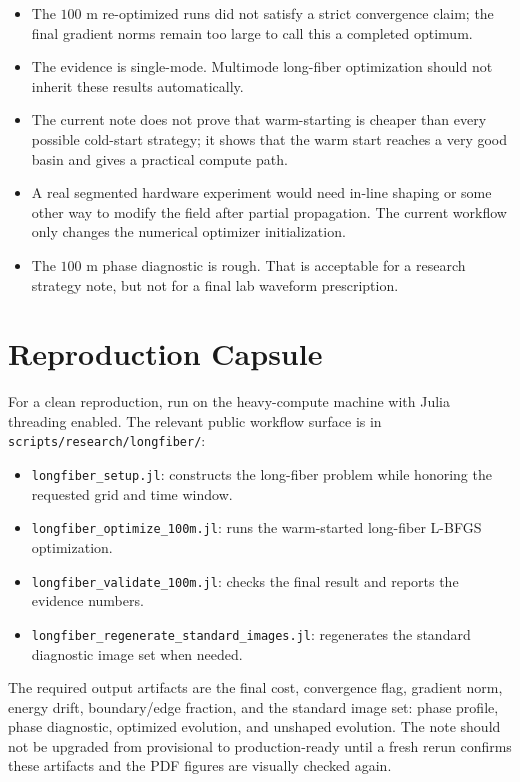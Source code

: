 \documentclass[11pt]{article}
\begin{document}
\begin{itemize}
\item The $100$ m re-optimized runs did not satisfy a strict convergence claim;
the final gradient norms remain too large to call this a completed optimum.
\item The evidence is single-mode.  Multimode long-fiber optimization should
not inherit these results automatically.
\item The current note does not prove that warm-starting is cheaper than every
possible cold-start strategy; it shows that the warm start reaches a very good
basin and gives a practical compute path.
\item A real segmented hardware experiment would need in-line shaping or some
other way to modify the field after partial propagation.  The current workflow
only changes the numerical optimizer initialization.
\item The $100$ m phase diagnostic is rough.  That is acceptable for a research
strategy note, but not for a final lab waveform prescription.
\end{itemize}

\section{Reproduction Capsule}

For a clean reproduction, run on the heavy-compute machine with Julia threading
enabled.  The relevant public workflow surface is in
\texttt{scripts/research/longfiber/}:
\begin{itemize}
\item \texttt{longfiber\_setup.jl}: constructs the long-fiber problem while
honoring the requested grid and time window.
\item \texttt{longfiber\_optimize\_100m.jl}: runs the warm-started long-fiber
L-BFGS optimization.
\item \texttt{longfiber\_validate\_100m.jl}: checks the final result and
reports the evidence numbers.
\item \texttt{longfiber\_regenerate\_standard\_images.jl}: regenerates the
standard diagnostic image set when needed.
\end{itemize}

The required output artifacts are the final cost, convergence flag, gradient
norm, energy drift, boundary/edge fraction, and the standard image set:
phase profile, phase diagnostic, optimized evolution, and unshaped evolution.
The note should not be upgraded from provisional to production-ready until a
fresh rerun confirms these artifacts and the PDF figures are visually checked
again.
\end{document}
